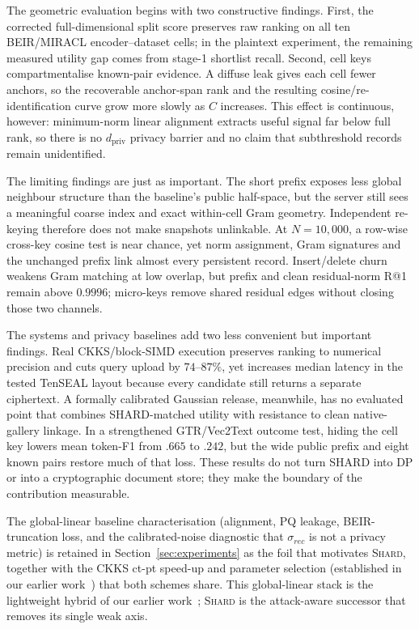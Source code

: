 \documentclass[11pt,a4paper]{article}
\begin{document}
The geometric evaluation begins with two constructive findings. First, the
corrected full-dimensional split score preserves raw
ranking on all ten BEIR/MIRACL encoder--dataset cells; in the plaintext
experiment, the remaining measured utility gap comes from stage-1 shortlist
recall. Second, cell keys compartmentalise
known-pair evidence. A diffuse leak gives each cell fewer anchors, so the
recoverable anchor-span rank and the resulting cosine/re-identification curve
grow more slowly as $C$ increases. This effect is continuous, however:
minimum-norm linear alignment extracts useful signal far below full rank, so
there is no $d_{\mathrm{priv}}$ privacy barrier and no claim that subthreshold
records remain unidentified.

The limiting findings are just as important. The short prefix exposes less global neighbour structure than the
baseline's public half-space, but the server still sees a meaningful coarse
index and exact within-cell Gram geometry. Independent re-keying therefore
does not make snapshots unlinkable. At $N=10{,}000$, a row-wise cross-key
cosine test is near chance, yet norm assignment, Gram signatures and the
unchanged prefix link almost every persistent record. Insert/delete churn
weakens Gram matching at low overlap, but prefix and clean residual-norm R@1
remain above $0.9996$; micro-keys remove shared residual edges without closing
those two channels.

The systems and privacy baselines add two less convenient but important
findings. Real CKKS/block-SIMD execution preserves ranking to numerical
precision and cuts query upload by $74$--$87\%$, yet increases median latency
in the tested TenSEAL layout because every candidate still returns a separate
ciphertext. A formally calibrated Gaussian release, meanwhile, has no
evaluated point that combines SHARD-matched utility with resistance to clean
native-gallery linkage. In a strengthened GTR/Vec2Text outcome test, hiding
the cell key lowers mean token-F1 from $.665$ to $.242$, but the wide public
prefix and eight known pairs restore much of that loss. These results do not
turn SHARD into DP or into a
cryptographic document store; they make the boundary of the contribution
measurable.

\noindent
The global-linear baseline characterisation (alignment, PQ leakage,
BEIR-truncation loss, and the calibrated-noise diagnostic that
$\sigma_{rec}$ is not a privacy metric) is retained in
Section~\ref{sec:experiments} as the foil that motivates \textsc{Shard},
together with the CKKS ct-pt speed-up and parameter selection
(established in our earlier work~\cite{ref_vkit,ref_alpha}) that both schemes
share. This global-linear stack is the lightweight hybrid of our earlier
work~\cite{ref_vkit}; \textsc{Shard} is the attack-aware successor that
removes its single weak axis.
\end{document}
